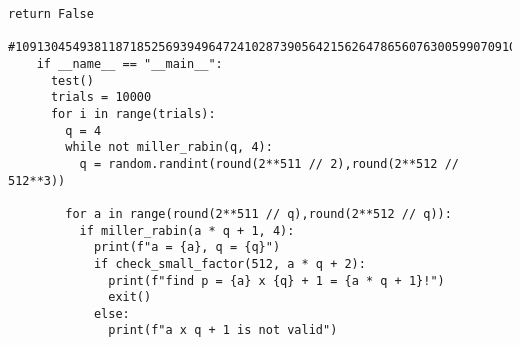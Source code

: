\documentclass[12pt,letterpaper]{article}
\begin{document}
\begin{lstlisting}[style = Python]
      return False
    #10913045493811871852569394964724102873905642156264786560763005990709106771829755587612621391713280494128728101890526468375891388805228227335026310649255093
    if __name__ == "__main__":
      test()
      trials = 10000
      for i in range(trials):
        q = 4
        while not miller_rabin(q, 4):
          q = random.randint(round(2**511 // 2),round(2**512 // 512**3))
    
        for a in range(round(2**511 // q),round(2**512 // q)):
          if miller_rabin(a * q + 1, 4):
            print(f"a = {a}, q = {q}")
            if check_small_factor(512, a * q + 2):
              print(f"find p = {a} x {q} + 1 = {a * q + 1}!")
              exit()
            else:
              print(f"a x q + 1 is not valid")
  \end{lstlisting}
\end{document}

